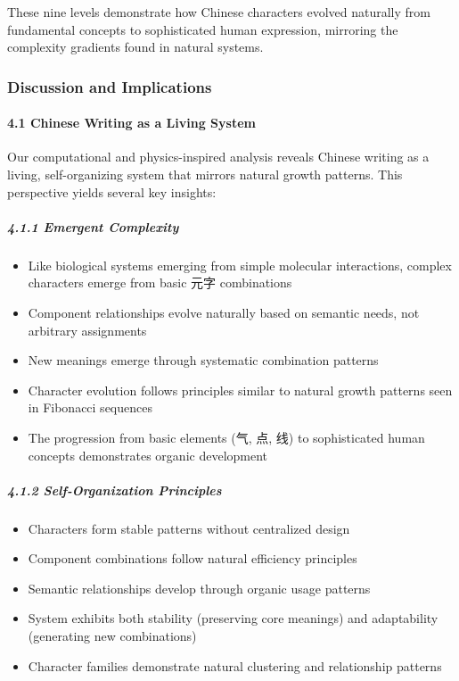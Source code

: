 \documentclass[
  11pt,
  letterpaper,
]{article}
\providecommand{\tightlist}{%
  \setlength{\itemsep}{0pt}\setlength{\parskip}{0pt}}
\begin{document}
These nine levels demonstrate how Chinese characters evolved naturally
from fundamental concepts to sophisticated human expression, mirroring
the complexity gradients found in natural systems.

\subsubsection{Discussion and
Implications}\label{discussion-and-implications}

\paragraph{4.1 Chinese Writing as a Living
System}\label{chinese-writing-as-a-living-system}

Our computational and physics-inspired analysis reveals Chinese writing
as a living, self-organizing system that mirrors natural growth
patterns. This perspective yields several key insights:

\subparagraph{4.1.1 Emergent Complexity}\label{emergent-complexity}

\begin{itemize}
\tightlist
\item
  Like biological systems emerging from simple molecular interactions,
  complex characters emerge from basic 元字 combinations
\item
  Component relationships evolve naturally based on semantic needs, not
  arbitrary assignments
\item
  New meanings emerge through systematic combination patterns
\item
  Character evolution follows principles similar to natural growth
  patterns seen in Fibonacci sequences
\item
  The progression from basic elements (气, 点, 线) to sophisticated
  human concepts demonstrates organic development
\end{itemize}

\subparagraph{4.1.2 Self-Organization
Principles}\label{self-organization-principles}

\begin{itemize}
\tightlist
\item
  Characters form stable patterns without centralized design
\item
  Component combinations follow natural efficiency principles
\item
  Semantic relationships develop through organic usage patterns
\item
  System exhibits both stability (preserving core meanings) and
  adaptability (generating new combinations)
\item
  Character families demonstrate natural clustering and relationship
  patterns
\end{itemize}
\end{document}
